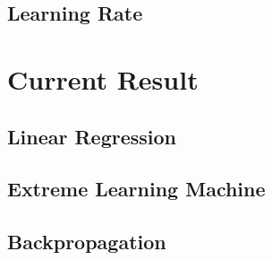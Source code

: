 \documentclass{article}
\begin{document}
\subsection{Learning Rate}

\section{Current Result}
\subsection{Linear Regression}
\subsection{Extreme Learning Machine}
\subsection{Backpropagation}



\end{document}
